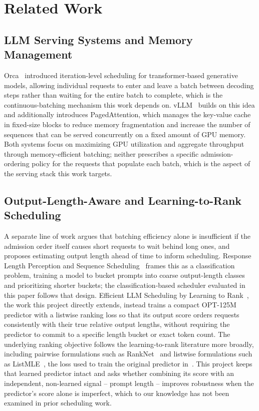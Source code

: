 \section{Related Work}
\label{sec:related_work}

\subsection{LLM Serving Systems and Memory Management}
\label{subsec:rw-serving}

Orca~\cite{yu2022orca} introduced iteration-level scheduling for
transformer-based generative models, allowing individual requests to enter
and leave a batch between decoding steps rather than waiting for the entire
batch to complete, which is the continuous-batching mechanism this work
depends on. vLLM~\cite{kwon2023vllm} builds on this idea and additionally
introduces PagedAttention, which manages the key-value cache in fixed-size
blocks to reduce memory fragmentation and increase the number of sequences
that can be served concurrently on a fixed amount of GPU memory. Both systems
focus on maximizing GPU utilization and aggregate throughput through
memory-efficient batching; neither prescribes a specific admission-ordering
policy for the requests that populate each batch, which is the aspect of the
serving stack this work targets.

\subsection{Output-Length-Aware and Learning-to-Rank Scheduling}
\label{subsec:rw-scheduling}

A separate line of work argues that batching efficiency alone is insufficient
if the admission order itself causes short requests to wait behind long ones,
and proposes estimating output length ahead of time to inform scheduling.
Response Length Perception and Sequence Scheduling~\cite{zheng2023responselength}
frames this as a classification problem, training a model to bucket prompts
into coarse output-length classes and prioritizing shorter buckets; the
classification-based scheduler evaluated in this paper follows that design.
Efficient LLM Scheduling by Learning to Rank~\cite{fu2024efficient}, the work
this project directly extends, instead trains a compact OPT-125M predictor
with a listwise ranking loss so that its output score orders requests
consistently with their true relative output lengths, without requiring the
predictor to commit to a specific length bucket or exact token count. The
underlying ranking objective follows the learning-to-rank literature more
broadly, including pairwise formulations such as RankNet~\cite{burges2005ranknet}
and listwise formulations such as ListMLE~\cite{xia2008listmle}, the loss used
to train the original predictor in~\cite{fu2024efficient}. This project keeps
that learned predictor intact and asks whether combining its score with an
independent, non-learned signal -- prompt length -- improves robustness when
the predictor's score alone is imperfect, which to our knowledge has not been
examined in prior scheduling work.

